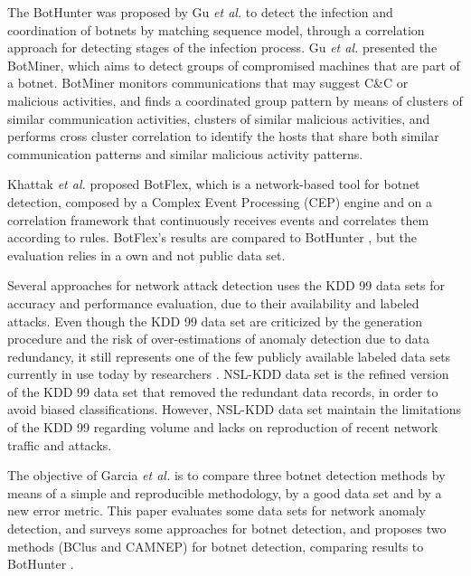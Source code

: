 The BotHunter was proposed by Gu \emph{et al.} \cite{gu2007bothunter} to detect the infection and coordination of botnets by matching sequence model, through a correlation approach for detecting stages of the infection process.  Gu \emph{et al.} \cite{gu2008botminer} presented the BotMiner, which aims to detect groups of compromised machines that are part of a botnet. BotMiner monitors communications that may suggest C\&C or malicious activities, and finds a coordinated group pattern by means of clusters of similar communication activities, clusters of similar malicious activities, and performs cross cluster correlation to identify the hosts that share both similar communication patterns and similar malicious activity patterns.

Khattak \emph{et al.} \cite{khattak2015botflex} proposed BotFlex, which is a network-based tool for botnet detection, composed by a Complex Event Processing (CEP) engine and on a correlation framework that continuously receives events and correlates them according to rules. BotFlex's results are compared to BotHunter \cite{gu2007bothunter}, but the evaluation relies in a own and not public data set.

Several approaches for network attack detection uses the KDD 99 \cite{ahmed2016survey,osanaiye2016distributed,bhuyan2014network} data sets for accuracy and performance evaluation, due to their availability and labeled attacks. Even though the KDD 99 data set are criticized by the generation procedure and the risk of over-estimations of anomaly detection due to data redundancy, it still represents one of the few publicly available labeled data sets currently in use today by researchers \cite{osanaiye2016distributed,bhuyan2014network}. NSL-KDD \cite{tavallaee2009detailed} data set is the refined version of the KDD 99 data set that removed the redundant data records, in order to avoid biased classifications. However, NSL-KDD data set maintain the limitations of the KDD 99 regarding volume and lacks on reproduction of recent network traffic and attacks.

The objective of Garcia \emph{et al.} \cite{garcia2014empirical} is to compare three botnet detection methods by means of a simple and reproducible methodology, by a good data set and by a new error metric. This paper evaluates some data sets for network anomaly detection, and surveys some approaches for botnet detection, and proposes two methods (BClus and CAMNEP) for botnet detection, comparing results to BotHunter \cite{gu2007bothunter}.

